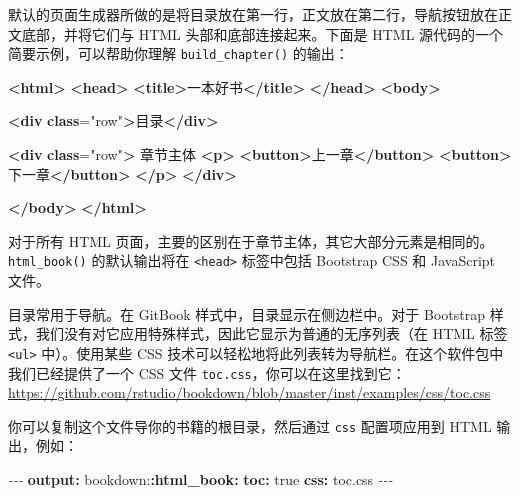 \documentclass[
  12pt,
]{krantz}
\newenvironment{Shaded}{\begin{snugshade}}{\end{snugshade}}
\newcommand{\AttributeTok}[1]{\textcolor[rgb]{0.13,0.29,0.53}{#1}}
\newcommand{\CharTok}[1]{\textcolor[rgb]{0.31,0.60,0.02}{#1}}
\newcommand{\ErrorTok}[1]{\textcolor[rgb]{0.64,0.00,0.00}{\textbf{#1}}}
\newcommand{\FunctionTok}[1]{\textcolor[rgb]{0.13,0.29,0.53}{\textbf{#1}}}
\newcommand{\KeywordTok}[1]{\textcolor[rgb]{0.13,0.29,0.53}{\textbf{#1}}}
\newcommand{\NormalTok}[1]{#1}
\newcommand{\OtherTok}[1]{\textcolor[rgb]{0.56,0.35,0.01}{#1}}
\newcommand{\PreprocessorTok}[1]{\textcolor[rgb]{0.56,0.35,0.01}{\textit{#1}}}
\newcommand{\StringTok}[1]{\textcolor[rgb]{0.31,0.60,0.02}{#1}}
\theoremstyle{definition}
\theoremstyle{definition}
\theoremstyle{definition}
\theoremstyle{definition}
\theoremstyle{remark}
\begin{document}
默认的页面生成器所做的是将目录放在第一行，正文放在第二行，导航按钮放在正文底部，并将它们与 HTML 头部和底部连接起来。下面是 HTML 源代码的一个简要示例，可以帮助你理解 \texttt{build\_chapter()} 的输出：

\begin{Shaded}
\begin{Highlighting}[]
\KeywordTok{\textless{}html\textgreater{}}
  \KeywordTok{\textless{}head\textgreater{}}
    \KeywordTok{\textless{}title\textgreater{}}\NormalTok{一本好书}\KeywordTok{\textless{}/title\textgreater{}}
  \KeywordTok{\textless{}/head\textgreater{}}
  \KeywordTok{\textless{}body\textgreater{}}
  
    \KeywordTok{\textless{}div} \ErrorTok{class}\OtherTok{=}\StringTok{"row"}\KeywordTok{\textgreater{}}\NormalTok{目录}\KeywordTok{\textless{}/div\textgreater{}}
    
    \KeywordTok{\textless{}div} \ErrorTok{class}\OtherTok{=}\StringTok{"row"}\KeywordTok{\textgreater{}}
\NormalTok{      章节主体}
      \KeywordTok{\textless{}p\textgreater{}}
        \KeywordTok{\textless{}button\textgreater{}}\NormalTok{上一章}\KeywordTok{\textless{}/button\textgreater{}}
        \KeywordTok{\textless{}button\textgreater{}}\NormalTok{下一章}\KeywordTok{\textless{}/button\textgreater{}}
      \KeywordTok{\textless{}/p\textgreater{}}
    \KeywordTok{\textless{}/div\textgreater{}}
  
  \KeywordTok{\textless{}/body\textgreater{}}
\KeywordTok{\textless{}/html\textgreater{}}
\end{Highlighting}
\end{Shaded}

对于所有 HTML 页面，主要的区别在于章节主体，其它大部分元素是相同的。\texttt{html\_book()} 的默认输出将在 \texttt{\textless{}head\textgreater{}} 标签中包括 Bootstrap CSS 和 JavaScript 文件。

目录常用于导航。在 GitBook 样式中，目录显示在侧边栏中。对于 Bootstrap 样式，我们没有对它应用特殊样式，因此它显示为普通的无序列表（在 HTML 标签 \texttt{\textless{}ul\textgreater{}} 中）。使用某些 CSS 技术可以轻松地将此列表转为导航栏。在这个软件包中我们已经提供了一个 CSS 文件 \texttt{toc.css}，你可以在这里找到它：\url{https://github.com/rstudio/bookdown/blob/master/inst/examples/css/toc.css}

你可以复制这个文件导你的书籍的根目录，然后通过 \texttt{css} 配置项应用到 HTML 输出，例如：

\begin{Shaded}
\begin{Highlighting}[]
\PreprocessorTok{{-}{-}{-}}
\FunctionTok{output}\KeywordTok{:}
\AttributeTok{  bookdown:}\FunctionTok{:html\_book}\KeywordTok{:}
\AttributeTok{    }\FunctionTok{toc}\KeywordTok{:}\AttributeTok{ }\CharTok{true}
\AttributeTok{    }\FunctionTok{css}\KeywordTok{:}\AttributeTok{ toc.css}
\PreprocessorTok{{-}{-}{-}}
\end{Highlighting}
\end{Shaded}
\end{document}
